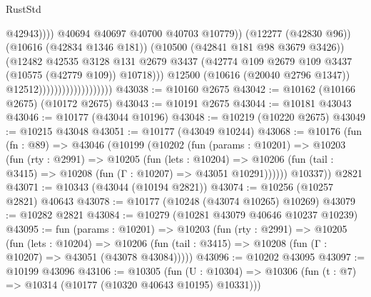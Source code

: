 \begin{lexlean}{RustStd}
\begin{coremodule}
                                                        @42943))))
                                                @40694
                                                @40697
                                                @40700
                                                @40703
                                                @10779))
                                            (@12277 (@42830 @96))
                                            (@10616 (@42834 @1346 @181))
                                            (@10500 (@42841 @181 @98 @3679 @3426))
                                            (@12482
                                              @42535
                                              @3128
                                              @131
                                              @2679
                                              @3437
                                              (@42774
                                                @109
                                                @2679
                                                @109
                                                @3437
                                                (@10575 (@42779 @109))
                                                @10718)))
                                          @12500
                                          (@10616 (@20040 @2796 @1347))
                                          @12512)))))))))))))))))))
@43038 := @10160 @2675
@43042 := @10162 (@10166 @2675) (@10172 @2675)
@43043 := @10191 @2675
@43044 := @10181 @43043
@43046 := @10177 (@43044 @10196)
@43048 := @10219 (@10220 @2675)
@43049 := @10215 @43048
@43051 := @10177 (@43049 @10244)
@43068 := @10176
    (fun (fn : @89) =>
    @43046
      (@10199
        (@10202
          (fun (params : @10201) =>
          @10203
            (fun (rty : @2991) =>
            @10205
              (fun (lets : @10204) =>
              @10206 (fun (tail : @3415) => @10208 (fun (Γ : @10207) => @43051 @10291))))))
        @10337))
    @2821
@43071 := @10343 (@43044 (@10194 @2821))
@43074 := @10256 (@10257 @2821) @40643
@43078 := @10177 (@10248 (@43074 @10265) @10269)
@43079 := @10282 @2821
@43084 := @10279 (@10281 @43079 @40646 @10237 @10239)
@43095 := fun (params : @10201) =>
  @10203
    (fun (rty : @2991) =>
    @10205
      (fun (lets : @10204) =>
      @10206 (fun (tail : @3415) => @10208 (fun (Γ : @10207) => @43051 (@43078 @43084)))))
@43096 := @10202 @43095
@43097 := @10199 @43096
@43106 := @10305
    (fun (U : @10304) => @10306 (fun (t : @7) => @10314 (@10177 (@10320 @40643 @10195) @10331)))

\end{coremodule}
\end{lexlean}
